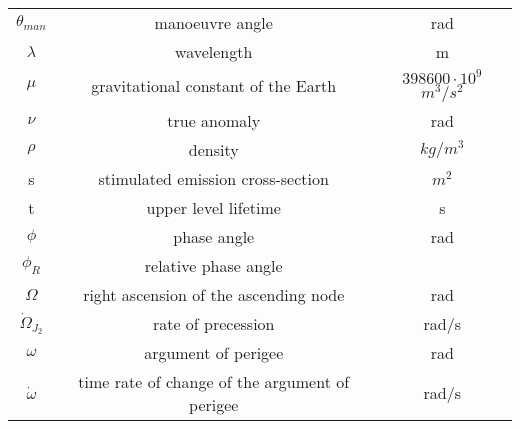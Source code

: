 \begin{center}
\begin{longtable}{c|c|c}
      $\theta _{man}$ & manoeuvre angle &        rad \\

         $\lambda$ & wavelength &          m \\

         $\mu$ & gravitational constant of the Earth & $398600\cdot 10^9$ $m^3/s^2$ \\

         $\nu$ & true anomaly &        rad \\

         $\rho$ &    density &      $kg/m^3$ \\

         s & stimulated emission cross-section &         $m^2$ \\

         t & upper level lifetime &          s \\

         $\phi$ & phase angle &        rad \\

        $\phi _R$ & relative phase angle &            \\

         $\Omega$  & right ascension of the ascending node &        rad \\

$\dot \Omega _{J_2 }$ & rate of precession &      rad/s \\

         $\omega$ & argument of perigee &        rad \\

$\dot \omega$ & time rate of change of the argument of perigee &      rad/s\\
 
\end{longtable}
\end{center}